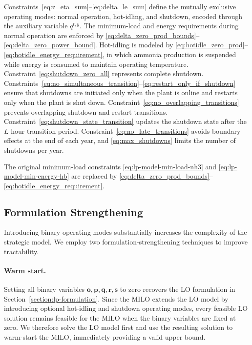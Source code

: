 \documentclass[11pt, letter]{article}
\begin{document}
Constraints~\eqref{eq:z_eta_sum}--\eqref{eq:delta_le_sum} define the mutually exclusive operating modes: normal operation, hot-idling, and shutdown, encoded through the auxiliary variable $q^{t,y}$. The minimum-load and energy requirements during normal operation are enforced by \eqref{eq:delta_zero_prod_bounds}--\eqref{eq:delta_zero_power_bound}. Hot-idling is modeled by \eqref{eq:hotidle_zero_prod}--\eqref{eq:hotidle_energy_requirement}, in which ammonia production is suspended while energy is consumed to maintain operating temperature. Constraint~\eqref{eq:shutdown_zero_all} represents complete shutdown. Constraints~\eqref{eq:no_simultaneous_transition}--\eqref{eq:restart_only_if_shutdown} ensure that shutdowns are initiated only when the plant is online and restarts only when the plant is shut down. Constraint~\eqref{eq:no_overlapping_transitions} prevents overlapping shutdown and restart transitions. Constraint~\eqref{eq:shutdown_state_transition} updates the shutdown state after the $L$-hour transition period. Constraint~\eqref{eq:no_late_transitions} avoids boundary effects at the end of each year, and \eqref{eq:max_shutdowns} limits the number of shutdowns per year.

The original minimum-load constraints \eqref{eq:lp-model-min-load-nh3} and \eqref{eq:lp-model-min-energy-hb} are replaced by \eqref{eq:delta_zero_prod_bounds}--\eqref{eq:hotidle_energy_requirement}.
\subsection{Formulation Strengthening}

Introducing binary operating modes substantially increases the complexity of the strategic model. We employ two formulation-strengthening techniques to improve tractability.

\paragraph{Warm start.}
Setting all binary variables $\boldsymbol{o,p,q,r,s}$ to zero recovers the LO formulation in Section~\ref{section:lp-formulation}. Since the MILO extends the LO model by introducing optional hot-idling and shutdown operating modes, every feasible LO solution remains feasible for the MILO when the binary variables are fixed at zero. We therefore solve the LO model first and use the resulting solution to warm-start the MILO, immediately providing a valid upper bound.
\end{document}
